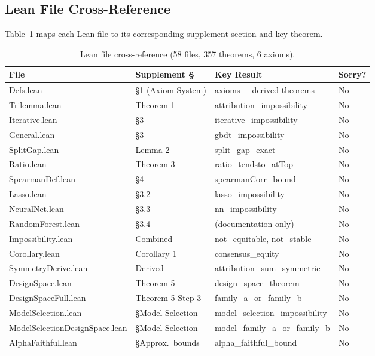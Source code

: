 \documentclass{article}
\begin{document}
\subsection{Lean File Cross-Reference}

Table~\ref{tab:lean-crossref} maps each Lean file to its corresponding
supplement section and key theorem.

\begin{table}[htbp]
\sloppy
\centering
\caption{Lean file cross-reference (58 files, 357 theorems, 6 axioms).}
\label{tab:lean-crossref}
\scriptsize
\begin{tabular}{@{}l>{\raggedright\arraybackslash}p{3cm}>{\raggedright\arraybackslash}p{5.5cm}l@{}}
\toprule
\textbf{File} & \textbf{Supplement \S} & \textbf{Key Result} & \textbf{Sorry?} \\
\midrule
Defs.lean & \S1 (Axiom System) & 6 axioms + derived theorems & No \\
Trilemma.lean & Theorem 1 & attribution\_impossibility & No \\
Iterative.lean & \S3 & iterative\_impossibility & No \\
General.lean & \S3 & gbdt\_impossibility & No \\
SplitGap.lean & Lemma 2 & split\_gap\_exact & No \\
Ratio.lean & Theorem 3 & ratio\_tendsto\_atTop & No \\
SpearmanDef.lean & \S4 & spearmanCorr\_bound & No \\
Lasso.lean & \S3.2 & lasso\_impossibility & No \\
NeuralNet.lean & \S3.3 & nn\_impossibility & No \\
RandomForest.lean & \S3.4 & (documentation only) & No \\
Impossibility.lean & Combined & not\_equitable, not\_stable & No \\
Corollary.lean & Corollary 1 & consensus\_equity & No \\
SymmetryDerive.lean & Derived & attribution\_sum\_symmetric & No \\
DesignSpace.lean & Theorem 5 & design\_space\_theorem & No \\
DesignSpaceFull.lean & Theorem 5 Step 3 & family\_a\_or\_family\_b & No \\
ModelSelection.lean & \S Model Selection & model\_selection\_impossibility & No \\
ModelSelectionDesignSpace.lean & \S Model Selection & model\_family\_a\_or\_family\_b & No \\
AlphaFaithful.lean & \S Approx.\ bounds & alpha\_faithful\_bound & No \\

\end{tabular}
\end{table}
\end{document}
